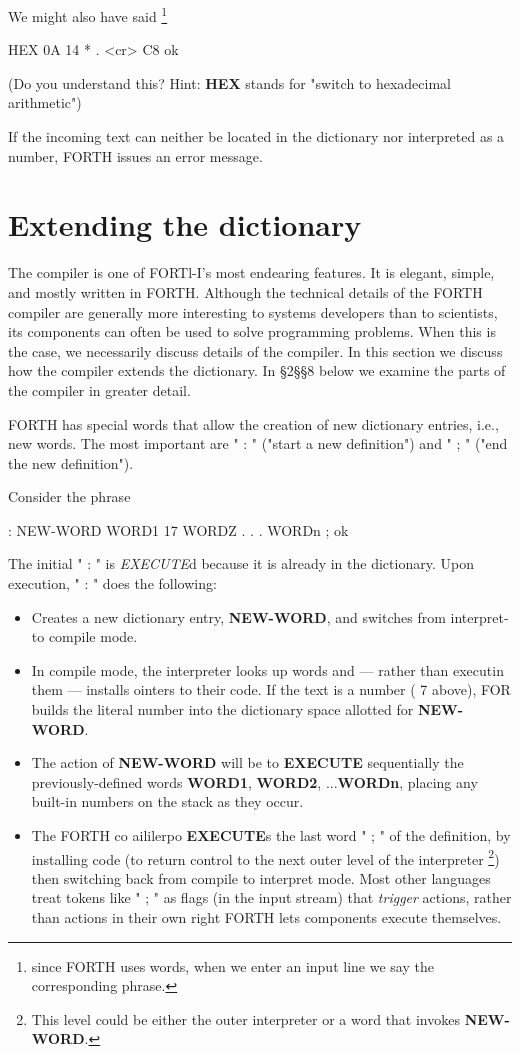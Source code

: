 We might also have said \footnote{since FORTH uses words, when we enter an input line we say the corresponding phrase.}

HEX 0A 14 * . <cr> C8 ok

(Do you understand this? Hint: \textbf{HEX} stands for "switch to hexadecimal arithmetic")

If the incoming text can neither be located in the dictionary nor interpreted as a number, FORTH issues an error message.


\section{Extending the dictionary}

The compiler is one of FORTl-I’s most endearing features. It is elegant, simple, and mostly written in FORTH. Although the technical details of the FORTH compiler are generally more interesting to systems developers than to scientists, its components can often be used to solve programming problems. When this is the case, we necessarily discuss details of the compiler. In this section we discuss how the compiler extends the dictionary. In §2§§8 below we examine the parts of the compiler in greater detail.

FORTH has special words that allow the creation of new dictionary entries, i.e., new words. The most important are " : " ("start a new definition") and " ; " ("end the new definition").

Consider the phrase

: NEW-WORD WORD1 17 WORDZ . . . WORDn ; ok

The initial " : " is \textit{EXECUTE}d because it is already in the dictionary. Upon execution, " : " does the following:

\begin{itemize}
    \item Creates a new dictionary entry, \textbf{NEW-WORD}, and switches from interpret- to compile mode.
    \item In compile mode, the interpreter looks up words and — rather than executin them — installs ointers to their code. If the text is a number ( 7 above), FOR builds the literal number into
the dictionary space allotted for \textbf{NEW-WORD}.
    \item The action of \textbf{NEW-WORD} will be to \textbf{EXECUTE} sequentially the previously-defined words \textbf{WORD1}, \textbf{WORD2}, ...\textbf{WORDn}, placing any built-in numbers on the stack as they occur.
    \item The FORTH co aililerpo \textbf{EXECUTE}s the last word " ; " of the definition, by installing code (to return control to the next outer level of the interpreter \footnote{This level could be either the outer interpreter or a word that invokes \textbf{ NEW-WORD}.}) then switching back from compile to interpret mode. Most other languages treat tokens like " ; " as ﬂags (in the input stream) that \textit{trigger} actions, rather than actions in their own right FORTH lets components execute themselves.
\end{itemize}

